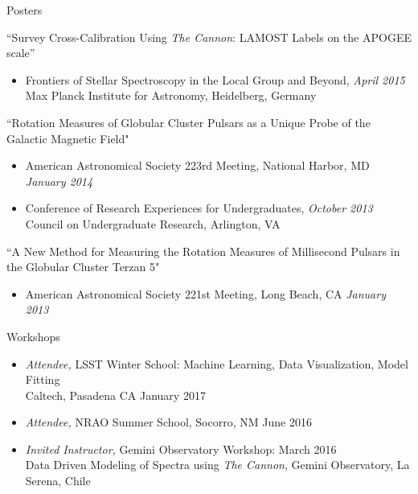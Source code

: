 \documentclass{resume} %
\begin{document}
\begin{rSection}{Posters}

``Survey Cross-Calibration Using \emph{The Cannon}:
LAMOST Labels on the APOGEE scale''
\begin{itemize}
  \item
    Frontiers of Stellar Spectroscopy in the Local Group and Beyond,
    \hfill {\em April 2015}\\
    Max Planck Institute for Astronomy, Heidelberg, Germany 

\end{itemize}

``Rotation Measures of Globular Cluster Pulsars as a Unique Probe of the Galactic Magnetic Field"
\begin{itemize}
\item
American Astronomical Society 223rd Meeting, 
National Harbor, MD \hfill {\em January 2014}
\item
Conference of Research Experiences for Undergraduates, \hfill {\em October 2013}\\
Council on Undergraduate Research, Arlington, VA 
\end{itemize}

``A New Method for Measuring the Rotation Measures of Millisecond Pulsars in the Globular Cluster Terzan 5" 
\begin{itemize}
\item
American Astronomical Society 221st Meeting, 
Long Beach, CA \hfill {\em January 2013}
\end{itemize}

\end{rSection}


\begin{rSection}{Workshops}

  \begin{itemize}
    \item
      \emph{Attendee,} LSST Winter School: Machine Learning, Data Visualization, Model Fitting \\
      Caltech, Pasadena CA \hfill January 2017

    \item
      \emph{Attendee,} NRAO Summer School, Socorro, NM \hfill June 2016 
    \item 
      \emph{Invited Instructor,} Gemini Observatory Workshop: \hfill March 2016 \\
      Data Driven Modeling of Spectra using \emph{The Cannon}, Gemini Observatory, La Serena, Chile 

  \end{itemize}


\end{rSection}
\end{document}
